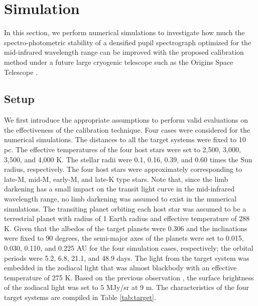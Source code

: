 \documentclass{aastex62}
\begin{document}
\section{Simulation} \label{sec:simulation}

In this section, we perform numerical simulations to investigate how much the spectro-photometric stability of a densified pupil spectrograph optimized for the mid-infrared wavelength range can be improved with the proposed calibration method under a future large cryogenic telescope such as the Origins Space Telescope \citep{2018arXiv180307730F}.


\subsection{Setup} \label{subsec:setup}

We first introduce the appropriate assumptions to perform valid evaluations on the effectiveness of the calibration technique. Four cases were considered for the numerical simulations. The distances to all the target systems were fixed to 10 pc. The effective temperatures of the four host stars were set to 2,500, 3,000, 3,500, and 4,000 K. The stellar radii were 0.1, 0.16, 0.39, and 0.60 times the Sun radius, respectively. The four host stars were approximately corresponding to late-M, mid-M, early-M, and late-K type stars. Note that, since the limb darkening has a small impact on the transit light curve in the mid-infrared wavelength range, no limb darkening was assumed to exist in the numerical simulations. The transiting planet orbiting each host star was assumed to be a terrestrial planet with radius of 1 Earth radius and effective temperature of 288 K. Given that the albedos of the target planets were 0.306 and the inclinations were fixed to 90 degrees, the semi-major axes of the planets were set to 0.015, 0.030, 0.110, and 0.225 AU for the four simulation cases, respectively; the orbital periods were 5.2, 6.8, 21.1, and 48.9 days. The light from the target system was embedded in the zodiacal light that was almost blackbody with an effective temperature of 275 K. Based on the previous observation \citep{2016AJ....151...71K}, the surface brightness of the zodiacal light was set to 5 MJy/sr at 9 \textmu m. The characteristics of the four target systems are compiled in Table \ref{tab:target}.
\end{document}
